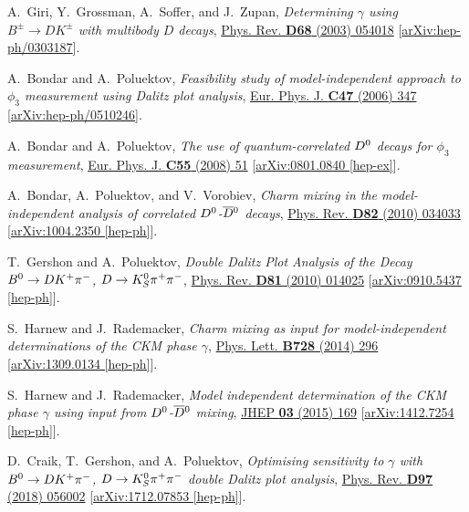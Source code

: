 \documentclass[a4paper,11pt]{article}
\begin{document}
\begin{thebibliography}{99}
A.~Giri, Y.~Grossman, A.~Soffer, and J.~Zupan, 
\textit{Determining $\gamma$ using $B^{\pm}\to DK^{\pm}$ with multibody $D$ decays}, 
\href{https://doi.org/10.1103/PhysRevD.68.054018}{Phys. Rev. \textbf{D68} (2003) 054018} 
[\href{https://arxiv.org/abs/hep-ph/0303187}{arXiv:hep-ph/0303187}].

A.~Bondar and A.~Poluektov, 
\textit{Feasibility study of model-independent approach to $\phi_3$ measurement using Dalitz plot analysis}, 
\href{https://doi.org/10.1140/epjc/s2006-02590-x}{Eur. Phys. J. \textbf{C47} (2006) 347} 
[\href{https://arxiv.org/abs/hep-ph/0510246}{arXiv:hep-ph/0510246}].

A.~Bondar and A.~Poluektov, 
\textit{The use of quantum-correlated $D^0$ decays for $\phi_3$ measurement}, 
\href{https://doi.org/10.1140/epjc/s10052-008-0600-z}{Eur. Phys. J. \textbf{C55} (2008) 51} 
[\href{https://arxiv.org/abs/0801.0840}{arXiv:0801.0840 [hep-ex]}].

A.~Bondar, A.~Poluektov, and V.~Vorobiev,
\textit{Charm mixing in the model-independent analysis of correlated $D^0$-$\overline{D}{}^0$ decays}, 
\href{https://doi.org/10.1103/PhysRevD.82.034033}{Phys. Rev. \textbf{D82} (2010) 034033} 
[\href{https://arxiv.org/abs/1004.2350}{arXiv:1004.2350 [hep-ph]}].

T.~Gershon and A.~Poluektov, 
\textit{Double Dalitz Plot Analysis of the Decay $B^0\to DK^+\pi^-$, $D\to K_S^0\pi^+\pi^-$}, 
\href{https://doi.org/10.1103/PhysRevD.81.014025}{Phys. Rev. \textbf{D81} (2010) 014025} 
[\href{https://arxiv.org/abs/0910.5437}{arXiv:0910.5437 [hep-ph]}].

S.~Harnew and J.~Rademacker, 
\textit{Charm mixing as input for model-independent determinations of the CKM phase $\gamma$}, 
\href{https://doi.org/10.1016/j.physletb.2013.11.065}{Phys. Lett. \textbf{B728} (2014) 296} 
[\href{https://arxiv.org/abs/1309.0134}{arXiv:1309.0134 [hep-ph]}].

S.~Harnew and J.~Rademacker,
\textit{Model independent determination of the CKM phase $\gamma$ using input from $D^0$-$\overline{D}{}^0$ mixing},
\href{https://doi.org/10.1007/JHEP03(2015)169}{JHEP \textbf{03} (2015) 169} 
[\href{https://arxiv.org/abs/1412.7254}{arXiv:1412.7254 [hep-ph]}].

D.~Craik, T.~Gershon, and A.~Poluektov,
\textit{Optimising sensitivity to $\gamma$ with $B^0\to DK^+\pi^-$, $D\to K_S^0\pi^+\pi^-$ double Dalitz plot analysis},
\href{https://doi.org/10.1103/PhysRevD.97.056002}{Phys. Rev. \textbf{D97} (2018) 056002}
[\href{https://arxiv.org/abs/1712.07853}{arXiv:1712.07853 [hep-ph]}].


\end{thebibliography}
\end{document}
